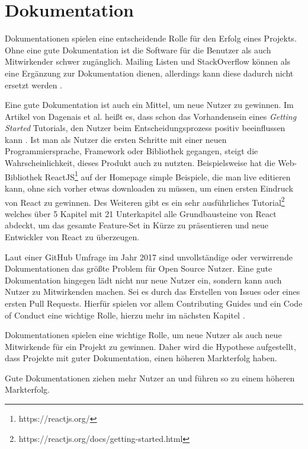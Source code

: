 \section{Dokumentation} \label{sec:Documentation}



Dokumentationen spielen eine entscheidende Rolle für den Erfolg eines Projekts.
Ohne eine gute Dokumentation ist die Software für die Benutzer als auch Mitwirkender schwer zugänglich. 
Mailing Listen und StackOverflow können als eine Ergänzung zur Dokumentation dienen, allerdings kann
diese dadurch nicht ersetzt werden \cite{bangerthWhatMakesComputational2013}. %


Eine gute Dokumentation ist auch ein Mittel, um neue Nutzer zu gewinnen. Im Artikel von Dagenais et al. heißt es,
dass schon das Vorhandensein eines \textit{Getting Started} Tutorials, den Nutzer beim 
Entscheidungsprozess positiv beeinflussen kann \cite{dagenaisDeveloperDocumentation}. %
Ist man als Nutzer die ersten Schritte mit einer neuen Programmiersprache, Framework oder Bibliothek
gegangen, steigt die Wahrscheinlichkeit, dieses Produkt auch zu nutzten.
Beispielsweise hat die Web-Bibliothek ReactJS\footnote{https://reactjs.org/} auf der Homepage simple 
Beispiele, die man live editieren kann, ohne sich vorher etwas downloaden zu müssen, um einen
ersten Eindruck von React zu gewinnen.
Des Weiteren gibt es ein sehr ausführliches Tutorial\footnote{https://reactjs.org/docs/getting-started.html}
welches über 5 Kapitel mit 21 Unterkapitel alle Grundbausteine von React abdeckt, um das gesamte 
Feature-Set in Kürze zu präsentieren und neue Entwickler von React zu überzeugen.

Laut einer GitHub Umfrage im Jahr 2017 sind unvollständige oder verwirrende Dokumentationen das größte
Problem für Open Source Nutzer. Eine gute Dokumentation hingegen lädt nicht nur neue Nutzer ein,
sondern kann auch Nutzer zu Mitwirkenden machen.
Sei es durch das Erstellen von Issues oder eines ersten Pull Requests.
Hierfür spielen vor allem Contributing Guides und ein Code of Conduct eine wichtige Rolle, hierzu
mehr im nächsten Kapitel \cite{GitHubOpenSourceSurvey2017}.

Dokumentationen spielen eine wichtige Rolle, um neue Nutzer als auch neue Mitwirkende für ein
Projekt zu gewinnen. 
Daher wird die Hypothese aufgestellt, dass Projekte mit guter Dokumentation, einen höheren
Markterfolg haben.


\begin{hypothesis}
    Gute Dokumentationen ziehen mehr Nutzer an und führen so zu einem höheren Markterfolg.
    \label{H:3}
\end{hypothesis}